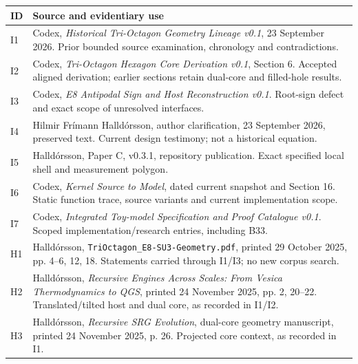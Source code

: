 \documentclass[
  11pt,
  a4paper,
]{article}
\newcounter{none} %
\begin{document}
{\def\LTcaptype{none} %
\begin{longtable}[]{@{}
  >{\raggedright\arraybackslash}p{}
  >{\raggedright\arraybackslash}p{}@{}}
\toprule\noalign{}
\begin{minipage}[b]{\linewidth}\raggedright
ID
\end{minipage} & \begin{minipage}[b]{\linewidth}\raggedright
Source and evidentiary use
\end{minipage} \\
\midrule\noalign{}
\endhead
\bottomrule\noalign{}
\endlastfoot
I1 & Codex, \emph{Historical Tri-Octagon Geometry Lineage v0.1}, 23 September 2026. Prior bounded source examination, chronology and contradictions. \\
I2 & Codex, \emph{Tri-Octagon Hexagon Core Derivation v0.1}, Section 6. Accepted aligned derivation; earlier sections retain dual-core and filled-hole results. \\
I3 & Codex, \emph{E8 Antipodal Sign and Host Reconstruction v0.1}. Root-sign defect and exact scope of unresolved interfaces. \\
I4 & Hilmir Frímann Halldórsson, author clarification, 23 September 2026, preserved text. Current design testimony; not a historical equation. \\
I5 & Halldórsson, Paper C, v0.3.1, repository publication. Exact specified local shell and measurement polygon. \\
I6 & Codex, \emph{Kernel Source to Model}, dated current snapshot and Section 16. Static function trace, source variants and current implementation scope. \\
I7 & Codex, \emph{Integrated Toy-model Specification and Proof Catalogue v0.1}. Scoped implementation/research entries, including B33. \\
H1 & Halldórsson, \texttt{TriOctagon\_E8-SU3-Geometry.pdf}, printed 29 October 2025, pp. 4--6, 12, 18. Statements carried through I1/I3; no new corpus search. \\
H2 & Halldórsson, \emph{Recursive Engines Across Scales: From Vesica Thermodynamics to QGS}, printed 24 November 2025, pp. 2, 20--22. Translated/tilted host and dual core, as recorded in I1/I2. \\
H3 & Halldórsson, \emph{Recursive SRG Evolution}, dual-core geometry manuscript, printed 24 November 2025, p. 26. Projected core context, as recorded in I1. \\
\end{longtable}
}
\end{document}
